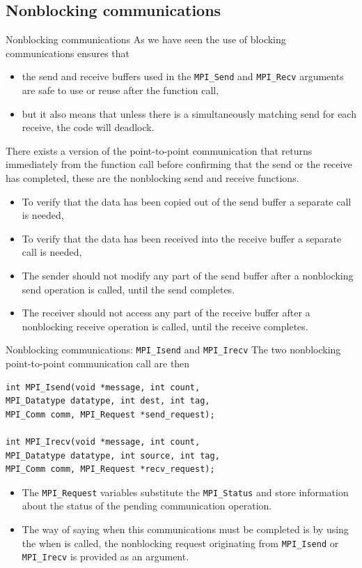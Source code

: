 \documentclass[xcolor={svgnames,usenames}]{beamer}
\begin{document}
\subsection{Nonblocking communications}
\begin{frame}{Nonblocking communications}
As we have seen the use of blocking communications ensures that
\begin{itemize} 
\item the send and receive buffers used in the \texttt{MPI_Send} and \texttt{MPI_Recv}
arguments are safe to use or reuse after the function call, 
\item but it also means that unless there is a simultaneously matching send for each receive, the code will deadlock.
\end{itemize}

There exists a version of the point-to-point communication that \alert{returns immediately} from the function call before
confirming that the send or the receive has completed, these are the nonblocking send and receive functions.
\begin{itemize}
\item<2-> To verify that the data has been copied out of the send
buffer a separate call is needed,
\item<2-> To verify that the data has been received into the receive buffer a separate call is needed,
\item<3-> The sender should not modify any part of the send buffer after a nonblocking
send operation is called, until the send completes.
\item<3-> The receiver should not access any part of the receive buffer after a nonblocking
receive operation is called, until the receive completes.
\end{itemize}
\end{frame}

\begin{frame}[fragile]{Nonblocking communications: \texttt{MPI_Isend} and \texttt{MPI_Irecv}}
The two nonblocking point-to-point communication call are then
\begin{verbatim}
int MPI_Isend(void *message, int count, 
MPI_Datatype datatype, int dest, int tag,
MPI_Comm comm, MPI_Request *send_request);

int MPI_Irecv(void *message, int count, 
MPI_Datatype datatype, int source, int tag,
MPI_Comm comm, MPI_Request *recv_request);
\end{verbatim}
\begin{itemize}
\item The \texttt{MPI_Request} variables substitute the \texttt{MPI_Status} and store information about the status of the pending communication operation.
\item The way of saying when this communications \alert{must} be completed is by using the 
when is called, the nonblocking request originating from \texttt{MPI_Isend} or \texttt{MPI_Irecv} is provided as an argument.
\end{itemize}
\end{frame}
\end{document}
